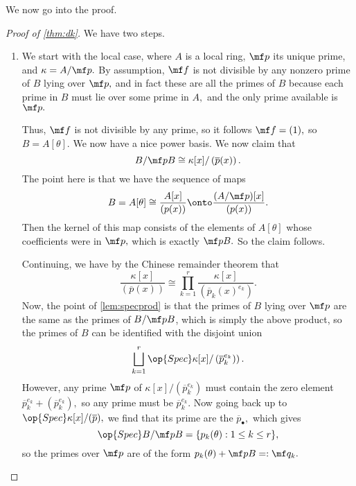 \documentclass[../notes.tex]{subfiles}
\begin{document}
We now go into the proof.
\begin{proof}[Proof of \autoref{thm:dk}]
	We have two steps.
	\begin{enumerate}
		\item We start with the local case, where $A$ is a local ring, $\mf p$ its unique prime, and $\kappa=A/\mf p.$ By assumption, $\mf f$ is not divisible by any nonzero prime of $B$ lying over $\mf p,$ and in fact these are all the primes of $B$ because each prime in $B$ must lie over some prime in $A,$ and the only prime available is $\mf p.$

		Thus, $\mf f$ is not divisible by any prime, so it follows $\mf f=(1),$ so $B=A[\theta].$ We now have a nice power basis. We now claim that
		\[B/\mf pB\cong\kappa[x]/\left(\overline p(x)\right).\]
		The point here is that we have the sequence of maps
		\[B=A[\theta]\cong\frac{A[x]}{(p(x))}\onto\frac{(A/\mf p)[x]}{(p(x))}.\]
		Then the kernel of this map consists of the elements of $A[\theta]$ whose coefficients were in $\mf p,$ which is exactly $\mf pB.$ So the claim follows.

		Continuing, we have by the Chinese remainder theorem that
		\[\frac{\kappa[x]}{(\overline p(x))}\cong\prod_{k=1}^r\frac{\kappa[x]}{\left(\overline p_k(x)^{e_k}\right)}.\]
		Now, the point of \autoref{lem:specprod} is that the primes of $B$ lying over $\mf p$ are the same as the primes of $B/\mf pB$, which is simply the above product, so the primes of $B$ can be identified with the disjoint union
		\[\bigsqcup_{k=1}^r\op{Spec}\kappa[x]/\left(\overline p_k^{e_k})\right).\]
		However, any prime $\mf p$ of $\kappa[x]/\left(\overline p_k^{e_k}\right)$ must contain the zero element $\overline p_k^{e_k}+\left(\overline p_k^{e_k}\right),$ so any prime must be $\overline p_k^{e_k}.$ Now going back up to $\op{Spec}\kappa[x]/(\overline p),$ we find that its prime are the $\overline p_\bullet,$ which gives
		\[\op{Spec}B/\mf pB=\{p_k(\theta):1\le k\le r\},\]
		so the primes over $\mf p$ are of the form $p_k(\theta)+\mf pB=:\mf q_k.$


\end{enumerate}
\end{proof}
\end{document}
